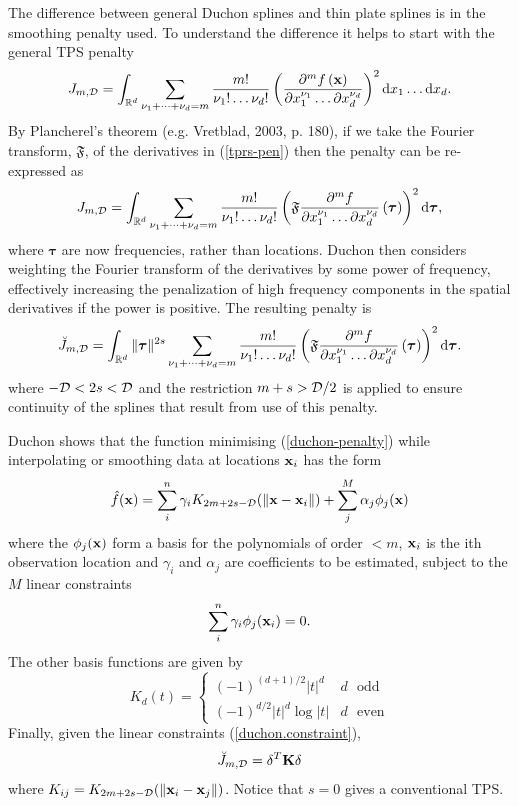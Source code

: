 \documentclass[useAMS, referee]{biom}
\newcommand{\beq}{\begin{equation}}
\newcommand{\eeq}{\end{equation}}
\newcommand{\ts}{^T}
\begin{document}
The difference between general Duchon splines and thin plate splines is in the smoothing penalty used. To understand the difference it helps to start with the general TPS penalty
\begin{equation}
J_{m,{\cal D}} = \int_{\mathbb{R}^d} \sum_{\nu_1 + \dots + \nu_d=m} \frac{m!}{\nu_1! \dots \nu_d!} \left( \frac{\partial^m f \left (\mathbf{x} \right )}{\partial x_1^{\nu_1} \ldots  \partial x_d^{\nu_d}} \right)^2 \text{d} x_1 \ldots  \text{d} x_d.
\label{tprs-pen}
\end{equation}
By Plancherel's theorem (e.g. Vretblad, 2003, p. 180), if we take the Fourier transform, $\mathfrak{F}$, of the derivatives in (\ref{tprs-pen}) then the penalty can be re-expressed as
\begin{equation}
J_{m,{\cal D}} =  \int_{\mathbb{R}^d} \sum_{\nu_1 + \dots + \nu_d=m} \frac{m!}{\nu_1! \dots \nu_d!} \left ( \mathfrak{F} \frac{\partial^m f}{\partial x_1^{\nu_1} \ldots  \partial x_d^{\nu_d}} \left (  \boldsymbol{\tau}\right ) \right )^2 \text{d} \boldsymbol{\tau},
\label{tprs-pen-ft}
\end{equation}
where $\bm \tau$ are now frequencies, rather than locations. Duchon then considers weighting the Fourier transform of the derivatives by some power of frequency, effectively increasing the penalization of high frequency components in the spatial derivatives if the power is positive. The resulting penalty is 
\begin{equation}
\breve{J}_{m,{\cal D}} = \int_{\mathbb{R}^d} \| \boldsymbol{\tau} \|^{2s} \sum_{\nu_1 + \dots + \nu_d=m} \frac{m!}{\nu_1! \dots \nu_d!}\left ( \mathfrak{F} \frac{\partial^m f}{\partial x_1^{\nu_1} \ldots  \partial x_d^{\nu_d}} \left (\boldsymbol{\tau} \right ) \right )^2 \text{d} \boldsymbol{\tau}.
\label{duchon-penalty}
\end{equation}
where $-{\cal D} < 2s < {\cal D}$ and the restriction $m + s > {\cal D}/2$ is applied to ensure continuity of the splines that result from use of this penalty. 

Duchon shows that the function minimising (\ref{duchon-penalty}) while interpolating or smoothing data at locations ${\bf x}_i$ has the form 
$$
\hat f({\bf x}) = \sum_i^n \gamma_i K_{2m+2s-{\cal D}}(\|{\bf x}-{\bf x}_i\|) + \sum_j^M \alpha_j \phi_j({\bf x})
$$
where the $\phi_j({\bf x})$ form a basis for the polynomials of order $<m$, ${\bf x}_i$ is the ith observation location and $\gamma_i$ and $\alpha_j$ are coefficients to be estimated, subject to the $M$ linear constraints
\beq
\sum_i^n \gamma_i \phi_j({\bf x}_i)=0.
\label{duchon.constraint}
\eeq
The other basis functions are given by
$$
K_d(t) = \left \{ \begin{array}{ll}
(-1)^{(d+1)/2}|t|^d & d \text{~~odd}\\
(-1)^{d/2}|t|^d\log |t| & d \text{~~even}
\end{array} \right .
$$
Finally, given the linear constraints (\ref{duchon.constraint}),
$$
\breve{J}_{m,{\cal D}} = {\bf \delta} \ts {\bf K} {\bf \delta}
$$
where $K_{ij} = K_{2m+2s-{\cal D}}(\|{\bf x}_i-{\bf x}_j\|)$. Notice that $s=0$ gives a conventional TPS.
\end{document}
